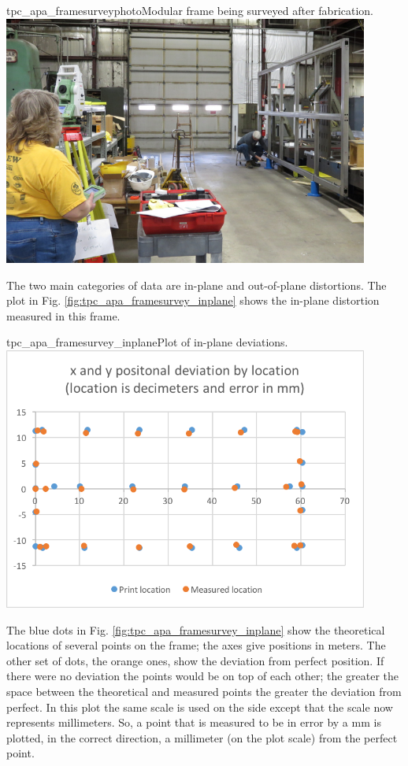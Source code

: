 \begin{cdrfigure}{tpc_apa_framesurveyphoto}{Modular frame being surveyed after fabrication.}
\includegraphics[width=0.9\textwidth]{figures/tpc_apa_framesurveyphoto.png} 
\end{cdrfigure}

The two main categories of data are in-plane and out-of-plane distortions. The plot in Fig. \ref{fig:tpc_apa_framesurvey_inplane} shows the in-plane distortion measured in this frame.

\begin{cdrfigure}{tpc_apa_framesurvey_inplane}{Plot of in-plane deviations.}
\includegraphics[width=0.9\textwidth]{figures/tpc_apa_framesurvey_inplane.png} 
\end{cdrfigure}

The blue dots in Fig. \ref{fig:tpc_apa_framesurvey_inplane} show the theoretical locations of several points on the frame; the axes give positions in meters.  The other set of dots, the orange ones, show the deviation from perfect position.  If there were no deviation the points would be on top of each other; the greater the space between the theoretical and measured points the greater the deviation from perfect.  In this plot the same scale is used on the side except that the scale now represents millimeters.  So, a point that is measured to be in error by a mm is plotted, in the correct direction, a millimeter (on the plot scale) from the perfect point.

